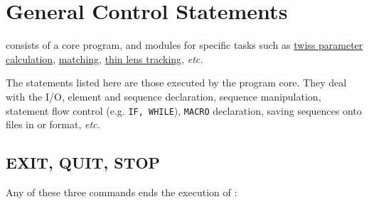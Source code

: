 

%
%
%
%


\chapter{General Control Statements} 

\madx consists of a core program, and modules for specific tasks such as
\hyperref[chap:twiss]{twiss parameter calculation},
\hyperref[chap:match]{matching}, \hyperref[chap:thintrack]{thin lens
  tracking}, \textsl{etc.}   
 
The statements listed here are those executed by the program core.
They deal with the I/O, element and sequence declaration, sequence
manipulation, statement flow control (e.g. \texttt{IF, WHILE}),
\texttt{MACRO} declaration, saving sequences onto files in \madx or
\madeight format, \textsl{etc.}  








\section{EXIT, QUIT, STOP}
\label{sec:exit}\label{sec:quit}\label{sec:stop}
Any of these three commands ends the execution of \madx:


